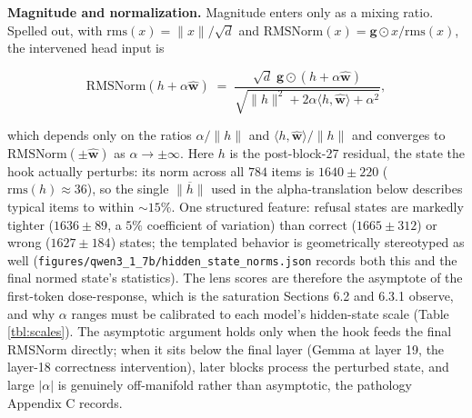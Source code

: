 \textbf{Magnitude and normalization.} Magnitude enters only as a mixing
ratio. Spelled out, with \(\mathrm{rms}(x) = \|x\|/\sqrt{d}\) and
\(\mathrm{RMSNorm}(x) = \mathbf{g} \odot x / \mathrm{rms}(x)\), the
intervened head input is

\[\mathrm{RMSNorm}(h + \alpha\hat{\mathbf{w}})
  \;=\; \frac{\sqrt{d}\; \mathbf{g} \odot (h + \alpha\hat{\mathbf{w}})}
  {\sqrt{\|h\|^{2} + 2\alpha \langle h, \hat{\mathbf{w}} \rangle + \alpha^{2}}},\]

which depends only on the ratios \(\alpha / \|h\|\) and
\(\langle h, \hat{\mathbf{w}} \rangle / \|h\|\) and converges to
\(\mathrm{RMSNorm}(\pm\hat{\mathbf{w}})\) as \(\alpha \to \pm\infty\).
Here \(h\) is the post-block-27 residual, the state the hook actually
perturbs: its norm across all \(784\) items is \(1640 \pm 220\)
(\(\mathrm{rms}(h) \approx 36\)), so the single \(\overline{\|h\|}\)
used in the alpha-translation below describes typical items to within
\(\sim 15\%\). One structured feature: refusal states are markedly
tighter (\(1636 \pm 89\), a \(5\%\) coefficient of variation) than
correct (\(1665 \pm 312\)) or wrong (\(1627 \pm 184\)) states; the
templated behavior is geometrically stereotyped as well
(\texttt{figures/qwen3\_1\_7b/hidden\_state\_norms.json} records both
this and the final normed state's statistics). The lens scores are
therefore the asymptote of the first-token dose-response, which is the
saturation Sections 6.2 and 6.3.1 observe, and why \(\alpha\) ranges
must be calibrated to each model's hidden-state scale (Table
\ref{tbl:scales}). The asymptotic argument holds only when the hook
feeds the final RMSNorm directly; when it sits below the final layer
(Gemma at layer 19, the layer-18 correctness intervention), later blocks
process the perturbed state, and large \(|\alpha|\) is genuinely
off-manifold rather than asymptotic, the pathology Appendix C records.

